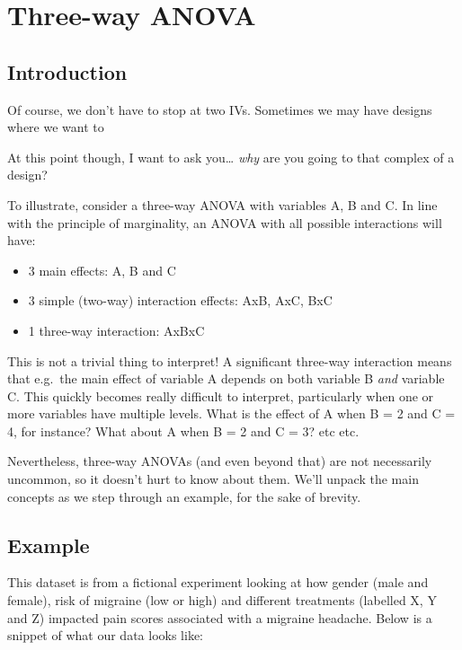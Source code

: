 \documentclass[
]{book}
\providecommand{\tightlist}{%
  \setlength{\itemsep}{0pt}\setlength{\parskip}{0pt}}
\begin{document}
\hypertarget{three-way-anova}{%
\section{Three-way ANOVA}\label{three-way-anova}}

\hypertarget{introduction-4}{%
\subsection{Introduction}\label{introduction-4}}

Of course, we don't have to stop at two IVs. Sometimes we may have designs where we want to

At this point though, I want to ask you\ldots{} \emph{why} are you going to that complex of a design?

To illustrate, consider a three-way ANOVA with variables A, B and C. In line with the principle of marginality, an ANOVA with all possible interactions will have:

\begin{itemize}
\tightlist
\item
  3 main effects: A, B and C
\item
  3 simple (two-way) interaction effects: AxB, AxC, BxC
\item
  1 three-way interaction: AxBxC
\end{itemize}

This is not a trivial thing to interpret! A significant three-way interaction means that e.g.~the main effect of variable A depends on both variable B \emph{and} variable C. This quickly becomes really difficult to interpret, particularly when one or more variables have multiple levels. What is the effect of A when B = 2 and C = 4, for instance? What about A when B = 2 and C = 3? etc etc.

Nevertheless, three-way ANOVAs (and even beyond that) are not necessarily uncommon, so it doesn't hurt to know about them. We'll unpack the main concepts as we step through an example, for the sake of brevity.

\hypertarget{example-5}{%
\subsection{Example}\label{example-5}}

This dataset is from a fictional experiment looking at how gender (male and female), risk of migraine (low or high) and different treatments (labelled X, Y and Z) impacted pain scores associated with a migraine headache. Below is a snippet of what our data looks like:
\end{document}
